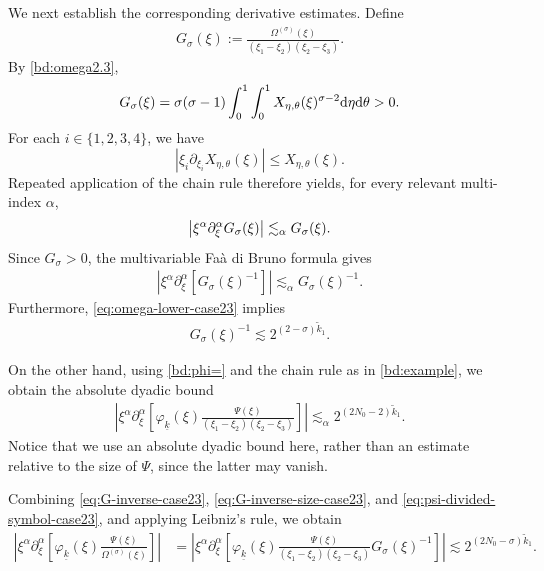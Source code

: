 \documentclass[UTF-8,reqno]{amsart}
\numberwithin{equation}{section}
\theoremstyle{definition}
\def\dif{{\mathord{{\rm d}}}}
\def\leq{\leqslant}
\def\dif{{\mathord{{\rm d}}}}
\def\leq{\leqslant}
\begin{document}
We next establish the corresponding derivative estimates. Define
\begin{align*}
G_\sigma(\xi)
:=
\frac{\Omega^{(\sigma)}(\xi)}
     {(\xi_1-\xi_2)(\xi_2-\xi_3)}.
\end{align*}
By \eqref{bd:omega2.3},
\begin{align*}
G_\sigma(\xi)
=
\sigma(\sigma-1)
\int_0^1\int_0^1
X_{\eta,\theta}(\xi)^{\sigma-2}
\dif\eta\dif\theta>0.
\end{align*}
For each $i\in\{1,2,3,4\}$, we have
\[
    |\xi_i\partial_{\xi_i}X_{\eta,\theta}(\xi)|
    \leq X_{\eta,\theta}(\xi).
\] 
Repeated application of the chain rule therefore yields, for every
relevant multi-index $\alpha$,
\begin{align}
\left|
\xi^\alpha\partial_\xi^\alpha
G_\sigma(\xi)
\right|
\lesssim_\alpha
G_\sigma(\xi).\notag
\end{align}
Since $G_\sigma>0$, the multivariable Fa\`a di Bruno formula gives
\begin{align}
\left|
\xi^\alpha\partial_\xi^\alpha
\left[
G_\sigma(\xi)^{-1}
\right]
\right|
\lesssim_\alpha
G_\sigma(\xi)^{-1}.
\label{eq:G-inverse-case23}
\end{align}
Furthermore, \eqref{eq:omega-lower-case23} implies
\begin{align}
G_\sigma(\xi)^{-1}
\lesssim
2^{(2-\sigma)\widetilde k_1}.
\label{eq:G-inverse-size-case23}
\end{align}

On the other hand, using \eqref{bd:phi=} and the chain rule as in
\eqref{bd:example}, we obtain the absolute dyadic bound
\begin{align}
\left|
\xi^\alpha\partial_\xi^\alpha
\left[
\varphi_{\underline k}(\xi)
\frac{\Psi(\xi)}
     {(\xi_1-\xi_2)(\xi_2-\xi_3)}
\right]
\right|
\lesssim_\alpha
2^{(2N_0-2)\widetilde k_1}.
\label{eq:psi-divided-symbol-case23}
\end{align}
Notice that we use an absolute dyadic bound here, rather than an
estimate relative to the size of $\Psi$, since the latter may vanish.

Combining \eqref{eq:G-inverse-case23},
\eqref{eq:G-inverse-size-case23}, and
\eqref{eq:psi-divided-symbol-case23}, and applying Leibniz's rule, we
obtain
\begin{align}
\left|
\xi^\alpha\partial_\xi^\alpha
\left[
\varphi_{\underline k}(\xi)
\frac{\Psi(\xi)}{\Omega^{(\sigma)}(\xi)}
\right]
\right|
&=
\left|
\xi^\alpha\partial_\xi^\alpha
\left[
\varphi_{\underline k}(\xi)
\frac{\Psi(\xi)}
     {(\xi_1-\xi_2)(\xi_2-\xi_3)}
G_\sigma(\xi)^{-1}
\right]
\right| \lesssim
2^{(2N_0-\sigma)\widetilde k_1}.
\label{bd:case2.3}
\end{align}
\end{document}
